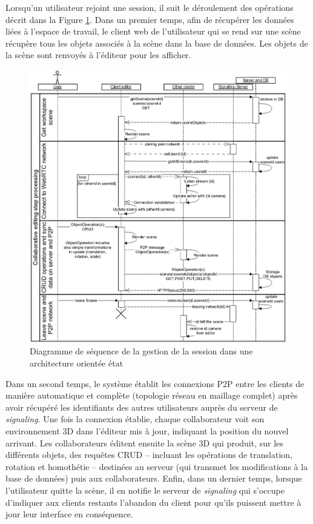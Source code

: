 Lorsqu'un utilisateur rejoint une session, il suit le déroulement des opérations 
décrit dans la Figure \ref{fig:sequence_state}. 
Dans un premier temps, afin de récupérer les données liées à l'espace de travail, 
le client web de l'utilisateur qui se rend sur une scène récupère 
tous les objets associés à la scène dans la base de données. Les objets de la 
scène sont renvoyés à l'éditeur pour les afficher. 

\begin{figure}[h!]
	\centering
	\includegraphics[trim={0 0 0 3cm},clip,width=0.9\columnwidth]
	{eps/sequence_wscg.eps}
	\caption{Diagramme de séquence de la gestion de la session dans une 
		architecture \og orientée état\fg{}}
	\label{fig:sequence_state}
\end{figure}

Dans un second temps, le système établit les connexions \gls{P2P} entre les 
clients de manière automatique et complète (topologie réseau en maillage 
complet) après avoir récupéré les identifiants des autres utilisateurs auprès du 
serveur de \textit{signaling}. Une fois la connexion établie, chaque collaborateur 
voit son environnement \gls{3D} dans l'éditeur mis à jour, indiquant la position du 
nouvel 
arrivant. Les collaborateurs éditent ensuite la scène \gls{3D} qui produit, sur les 
différents objets, des requêtes \gls{CRUD} -- incluant les opérations de translation, 
rotation et homothétie -- destinées au serveur (qui transmet les 
modifications à la base de données) puis aux collaborateurs.
Enfin, dans un dernier temps, lorsque l'utilisateur quitte la scène, il en notifie le 
serveur de \textit{signaling} qui s'occupe d'indiquer aux clients restants l'abandon 
du client pour qu'ils puissent mettre à jour leur interface en conséquence.



